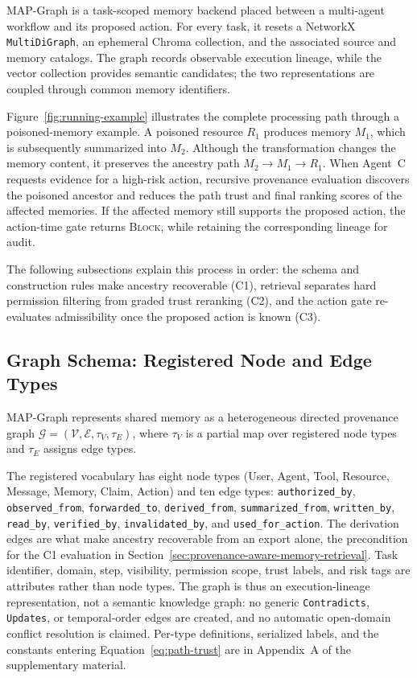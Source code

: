 \documentclass[letterpaper]{article} %
\begin{document}
MAP-Graph is a task-scoped memory backend placed between a multi-agent workflow and its proposed action. For every task, it resets a NetworkX \texttt{MultiDiGraph}, an ephemeral Chroma collection, and the associated source and memory catalogs. The graph records observable execution lineage, while the vector collection provides semantic candidates; the two representations are coupled through common memory identifiers.

Figure~\ref{fig:running-example} illustrates the complete processing path through a poisoned-memory example. A poisoned resource $R_1$ produces memory $M_1$, which is subsequently summarized into $M_2$. Although the transformation changes the memory content, it preserves the ancestry path $M_2 \rightarrow M_1 \rightarrow R_1$. When Agent~C requests evidence for a high-risk action, recursive provenance evaluation discovers the poisoned ancestor and reduces the path trust and final ranking scores of the affected memories. If the affected memory still supports the proposed action, the action-time gate returns \textsc{Block}, while retaining the corresponding lineage for audit.

The following subsections explain this process in order: the schema and construction rules make ancestry recoverable (C1), retrieval separates hard permission filtering from graded trust reranking (C2), and the action gate re-evaluates admissibility once the proposed action is known (C3).

\subsection{Graph Schema: Registered Node and Edge Types}
\label{sec:graph-schema}

MAP-Graph represents shared memory as a heterogeneous directed provenance graph $\mathcal{G} = (\mathcal{V}, \mathcal{E}, \tau_V, \tau_E)$, where $\tau_V$ is a partial map over registered node types and $\tau_E$ assigns edge types.

The registered vocabulary has eight node types (User, Agent, Tool, Resource, Message, Memory, Claim, Action) and ten edge types: \texttt{authorized\_by}, \texttt{observed\_from}, \texttt{forwarded\_to}, \texttt{derived\_from}, \texttt{summarized\_from}, \texttt{written\_by}, \texttt{read\_by}, \texttt{verified\_by}, \texttt{invalidated\_by}, and \texttt{used\_for\_action}. The derivation edges are what make ancestry recoverable from an export alone, the precondition for the C1 evaluation in Section~\ref{sec:provenance-aware-memory-retrieval}. Task identifier, domain, step, visibility, permission scope, trust labels, and risk tags are attributes rather than node types. The graph is thus an execution-lineage representation, not a semantic knowledge graph: no generic \texttt{Contradicts}, \texttt{Updates}, or temporal-order edges are created, and no automatic open-domain conflict resolution is claimed. Per-type definitions, serialized labels, and the constants entering Equation~\ref{eq:path-trust} are in Appendix~A of the supplementary material.
\end{document}
